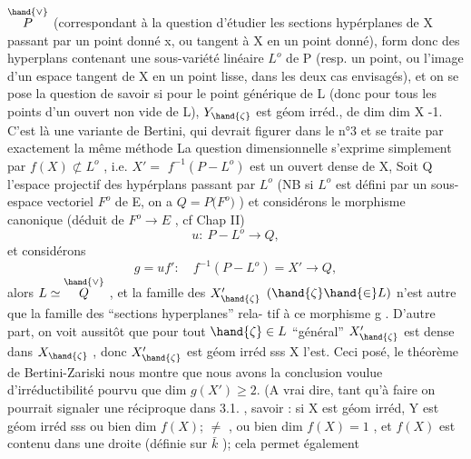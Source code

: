 
$\overset{\hand{\vee}}{P}$ (correspondant à la question d'étudier les sections hypérplanes de X
passant par un point donné x, ou tangent à X en un point  donné),
form donc des hyperplans contenant une sous-variété linéaire $L^{o}$ de P
(resp. un point,  ou l'image d'un espace tangent de X en un point lisse,
dans les deux cas envisagés), et on se pose la question de savoir si
pour le point générique \hand{$\zeta$} de L  (donc pour tous les points d'un ouvert
non vide de L),  $Y_{\hand{\zeta}}$  est  géom irréd., de
\margin{/} dim  dim X -1.   C'est là une variante  de Bertini, qui devrait figurer
dans  le n°3  et se traite par exactement la même méthode  La question
dimensionnelle s'exprime simplement par  $f(X)\not\subset L^{o}$ , 
i.e.  $X' =$  $f^{-1}(P - L^{o})$   est un ouvert dense de X, 
Soit Q l'espace projectif des hypérplans passant par $L^{o}$  (NB si  $L^{o}$ est
défini par un sous-espace vectoriel $F^{o}$ de E,  on a   $Q = P($$F^{o})$ ) et
considérons le morphisme  canonique  (déduit de  $F^{o}\longrightarrow E$ , cf
Chap II)
\[ u :\ P - L^{o} \longrightarrow Q, \]
et considérons
\[ g = u f' :\quad f^{-1}(P - L^{o}) = X' \longrightarrow Q , \]
alors   $L \simeq \overset{\hand{\vee}}{Q}$ ,  et la famille des
$X'_{\hand{\zeta}}$  $(\hand{\zeta}\hand{\in} L)$  n'est autre que la famille des ``sections hyperplanes'' rela-%
tif à ce morphisme  g . D'autre part, on voit aussitôt que pour tout
$\hand{\zeta}\in L$  ``général''  $X'_{\hand{\zeta}}$ est dense dans $X_{\hand{\zeta}}$ , donc  $X'_{\hand{\zeta}}$  est géom irréd sss
X  l'est.  Ceci posé,  le théorème de Bertini-Zariski nous montre que
nous avons la conclusion voulue  d'irréductibilité pourvu que
dim $g(X') \geqslant 2$. (A vrai dire, tant qu'à faire on pourrait signaler une
réciproque dans 3.1. , savoir :  si X est géom irréd, Y  est
géom irréd sss  ou bien  dim $f(X)$; $\neq$ , ou bien  dim $f(X)=1$ , et $f(X)$
est contenu dans une droite (définie sur $\bar{k}$ )\hand{)}; cela permet également

